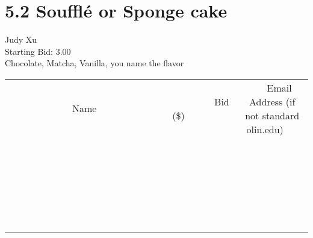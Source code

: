 \documentclass[11pt]{article}
\begin{document}
					\section*{5.2 Soufflé or Sponge cake}
					Judy Xu \\
					Starting Bid: 3.00 \\
					Chocolate, Matcha, Vanilla, you name the flavor \\
					[6ex]
					\begin{tabular}{c c c}
						~~~~~~~~~~~~~Name~~~~~~~~~~~~~ & ~~~~~~~~~Bid (\$)~~~~~~~~~ & ~~~Email Address (if not standard olin.edu)~~~ \\
				
 & & \\
\hline
 & & \\
\hline
 & & \\
\hline
 & & \\
\hline
 & & \\
\hline
 & & \\
\hline
 & & \\
\hline
 & & \\
\hline
 & & \\
\hline
 & & \\
\hline
 & & \\
\hline
 & & \\
\hline
 & & \\
\hline
 & & \\
\hline
 & & \\
\hline
 & & \\
\hline
 & & \\
\hline
 & & \\
\hline
 & & \\
\hline
 & & \\
\hline
 & & \\
\hline
 & & \\
\hline
 & & \\
\hline
 & & \\
\hline
 & & \\
\hline
 & & \\
\hline
					\end{tabular}
					\clearpage
				
\end{document}
